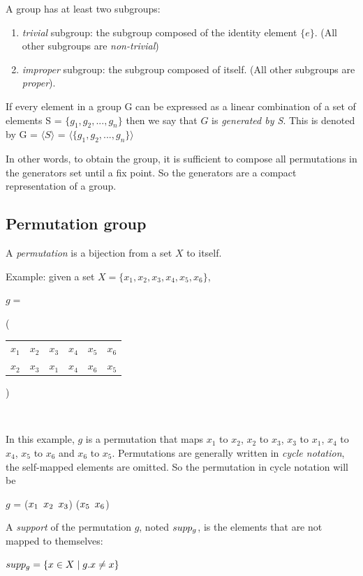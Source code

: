 A group has at least two subgroups: 
\begin{enumerate}[topsep=0pt,nolistsep]
 \item \emph{trivial} subgroup: the subgroup composed of the identity element $\{e\}$. (All other subgroups are \textit{non-trivial})
 \item \emph{improper} subgroup: the subgroup composed of itself. (All other subgroups are \emph{proper}).
\end{enumerate}
\begin{definition}
 If every element in a group G can be expressed as a linear combination
 of a set of elements S = $\{g_1, g_2, ..., g_n \}$ then we say that $G$ is 
 \textit{generated by S}. This is denoted by G = $\langle S \rangle$ =
 $\langle \{g_1, g_2, ..., g_n \} \rangle$ 
\end{definition}
In other words, to obtain the group, it is sufficient to compose all permutations in the generators set until a fix point.
So the generators are a compact representation of a group.
\subsection{Permutation group}
\begin{definition}[Permutation]
 A \emph{permutation} is a bijection from a set $X$ to itself.
\end{definition}
Example: given a set $X = \{x_1, x_2, x_3, x_4, x_5, x_6\}$,
\begin{center}
$g = ${\Bigg( \begin{tabular}{cccccc}
  $x_1$ & $x_2$ & $x_3$ & $x_4$ & $x_5$ & $x_6$\\
  $x_2$ & $x_3$ & $x_1$ & $x_4$ & $x_6$ & $x_5$
 \end{tabular} \Bigg)}\\
\end{center}
In this example, $g$ is a permutation that maps $x_1$ to $x_2$, $x_2$ to $x_3$, $x_3$ to $x_1$, $x_4$ to $x_4$, $x_5$ to $x_6$ and $x_6$ to $x_5$.
Permutations are generally written in \emph{cycle notation}, the self-mapped elements are omitted.
So the permutation in cycle notation will be 
\begin{center}
 $g$ = ($x_1 \enskip x_2 \enskip x_3$) ($x_5 \enskip x_6$)
\end{center}
\begin{definition}
 A \emph{support} of the permutation $g$, noted $supp_{g}$, is the elements that are not mapped to themselves:
 \begin{center}
  $supp_{g} = \{ x \in X \mid g.x \neq x\}$
 \end{center}
\end{definition}

